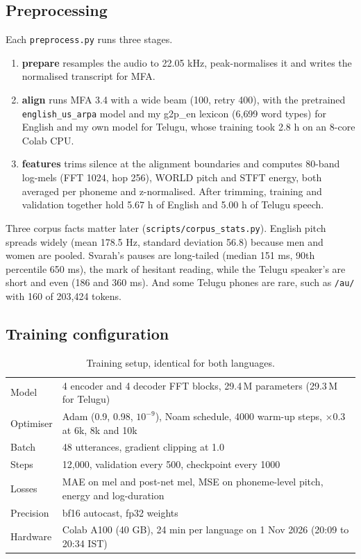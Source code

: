 \documentclass[11pt,a4paper]{article}
\newcommand{\code}[1]{\texttt{#1}}
\newcommand{\ph}[1]{\texttt{/#1/}}
\begin{document}
\subsection{Preprocessing}
Each \code{preprocess.py} runs three stages.
\begin{enumerate}
\item \textbf{prepare} resamples the audio to 22.05 kHz, peak-normalises it and writes the normalised transcript
  for MFA.
\item \textbf{align} runs MFA 3.4 with a wide beam (100, retry 400), with the pretrained \code{english\_us\_arpa}
  model and my g2p\_en lexicon (6{,}699 word types) for English and my own model for Telugu, whose training took 2.8 h on an 8-core
  Colab CPU.
\item \textbf{features} trims silence at the alignment boundaries and computes 80-band log-mels (FFT 1024, hop
  256), WORLD pitch and STFT energy, both averaged per phoneme and z-normalised. After trimming, training and
  validation together hold 5.67 h of English and 5.00 h of Telugu speech.
\end{enumerate}
Three corpus facts matter later (\code{scripts/corpus\_stats.py}). English pitch spreads widely (mean 178.5 Hz,
standard deviation 56.8) because men and women are pooled. Svarah's pauses are long-tailed (median 151 ms,
90th percentile 650 ms), the mark of hesitant reading, while the Telugu speaker's are short and even (186 and
360 ms). And some Telugu phones are rare, such as \ph{au} with 160 of 203{,}424 tokens.

\subsection{Training configuration}
\begin{table}[!htbp]
\centering\small
\begin{tabular}{ll}
\toprule
Model & 4 encoder and 4 decoder FFT blocks, 29.4\,M parameters (29.3\,M for Telugu) \\
Optimiser & Adam (0.9, 0.98, $10^{-9}$), Noam schedule, 4000 warm-up steps, $\times$0.3 at 6k, 8k and 10k \\
Batch & 48 utterances, gradient clipping at 1.0 \\
Steps & 12{,}000, validation every 500, checkpoint every 1000 \\
Losses & MAE on mel and post-net mel, MSE on phoneme-level pitch, energy and log-duration \\
Precision & bf16 autocast, fp32 weights \\
Hardware & Colab A100 (40 GB), 24 min per language on 1 Nov 2026 (20:09 to 20:34 IST) \\
\bottomrule
\end{tabular}
\caption{Training setup, identical for both languages.}
\end{table}
\end{document}
